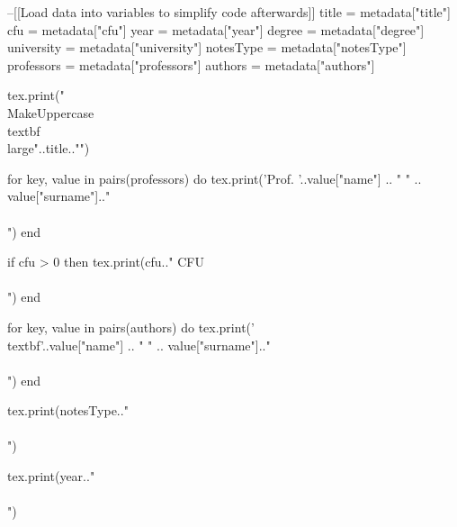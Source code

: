 \hypersetup{pageanchor=false}
\ifLuaTeX
\begin{luacode}
--[[Load data into variables to simplify code afterwards]]
title = metadata["title"]
cfu = metadata["cfu"]
year = metadata["year"]
degree = metadata["degree"]
university = metadata["university"]
notesType = metadata["notesType"]
professors = metadata["professors"]
authors = metadata["authors"]
\end{luacode}


\begin{titlepage}
\begin{center}
\vspace*{1em}
\begin{luacode}
		tex.print("\\MakeUppercase{\\textbf{\\large{"..title.."}}}")
\end{luacode}

\vspace{1em}

\begin{luacode}
		for key, value in pairs(professors) do
			 tex.print('Prof. '..value["name"] .. " " .. value["surname"].."\\\\")
		end
\end{luacode}
\begin{luacode}
	if cfu > 0 then
		tex.print(cfu.." CFU\\\\")
	end
\end{luacode}

\vspace{1em}

\begin{luacode}
		for key, value in pairs(authors) do
			 tex.print('\\textbf{'..value["name"] .. " " .. value["surname"].."}\\\\")
		end
\end{luacode}

\vfill

\begin{luacode}
		tex.print(notesType.."\\\\")
\end{luacode}
\begin{luacode}
		tex.print(year.."\\\\")
\end{luacode}


\end{center}
\end{titlepage}
